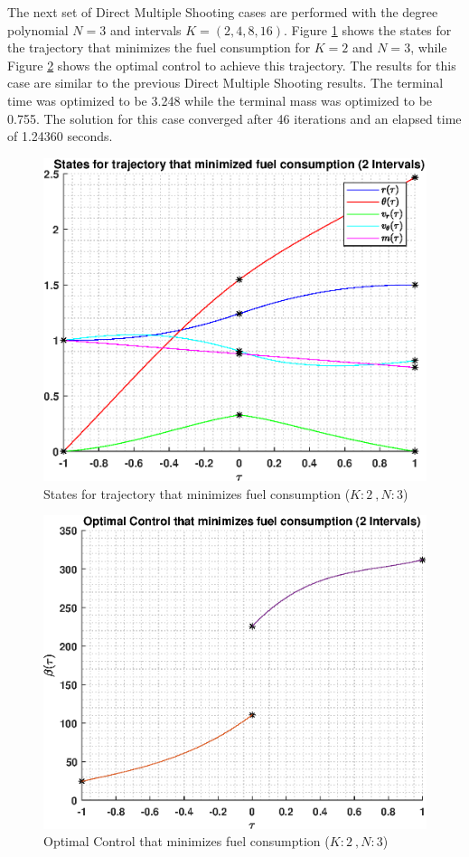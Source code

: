 \documentclass[]{article}
\begin{document}
\noindent
The next set of Direct Multiple Shooting cases are performed with the degree polynomial \(N = 3\) and intervals \(K = (2,4,8,16)\). Figure \ref{fig:directStatesK2Poly3} shows the states for the trajectory that minimizes the fuel consumption for \(K = 2\) and  \(N = 3\), while Figure \ref{fig:directControlK2Poly3} shows the optimal control to achieve this trajectory. The results for this case are similar to the previous Direct Multiple Shooting results. The terminal time was optimized to be 3.248 while the terminal mass was optimized to be 0.755. The solution for this case converged after 46 iterations and an elapsed time of 1.24360 seconds.
\begin{figure}
	\centering
	\includegraphics[scale=0.75]{directStatesK2Poly3.eps}
	\caption{States for trajectory that minimizes fuel consumption (\(K:2\ , N:3\))}
	\label{fig:directStatesK2Poly3}
\end{figure}
\begin{figure}
	\centering
	\includegraphics[scale=0.75]{directControlK2Poly3.eps}
	\caption{Optimal Control that minimizes fuel consumption (\(K:2\ , N:3\))}
	\label{fig:directControlK2Poly3}
\end{figure}
\end{document}
